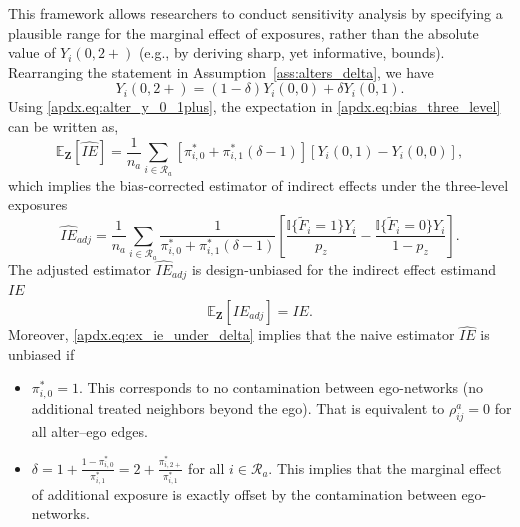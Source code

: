 \documentclass[11pt]{article}
\theoremstyle{definition}
\def \bZ {\boldsymbol{Z}}
\def \cR {\mathcal{R}}
\def \EX {\mathbb{E}}
\begin{document}
This framework allows researchers to conduct sensitivity analysis by 
    specifying a plausible range for the marginal effect of exposures,
     rather than the absolute value of $Y_i(0, 2+)$ (e.g., by deriving sharp, yet informative, bounds).
 Rearranging the statement in Assumption~\ref{ass:alters_delta}, we have
\begin{equation}
    \label{apdx.eq:alter_y_0_1plus}
    Y_i(0, 2+) = (1-\delta) Y_i(0, 0) + \delta Y_i(0, 1).
\end{equation}
Using \eqref{apdx.eq:alter_y_0_1plus}, the expectation in \eqref{apdx.eq:bias_three_level} 
can be written as,
\begin{equation}
    \label{apdx.eq:ex_ie_under_delta}
    \EX_{\bZ}\left[\widehat{IE}\right] =
    \frac{1}{n_a}
    \sum_{i \in \cR_a}
    \left[
        \pi_{i,0}^* + \pi_{i,1}^*(\delta - 1)
    \right]
    \left[
        Y_i(0,1) - Y_i(0,0)
    \right],
\end{equation}
which implies the bias-corrected estimator of indirect effects under 
the three-level exposures
\begin{equation}
    \label{apdx.eq:ie_adjust_three_level}
    \widehat{IE}_{adj} =
    \frac{1}{n_a}
    \sum_{i \in \cR_a}
    \frac{1}{
        \pi_{i,0}^* + \pi_{i,1}^*(\delta - 1)
    }
    \left[
    \frac{\mathbb{I}\{\widetilde{F}_i=1\}Y_i}{p_z} 
    - 
    \frac{\mathbb{I}\{\widetilde{F}_i=0\}Y_i}{1-p_z} 
    \right].
\end{equation}
The adjusted estimator $\widehat{IE}_{adj}$ is design-unbiased for the indirect effect estimand $IE$
\begin{equation*}
    \EX_{\bZ}\left[\widehat{IE}_{adj}\right] = IE.
\end{equation*}
Moreover, \eqref{apdx.eq:ex_ie_under_delta} implies that the naive estimator $\widehat{IE}$ is unbiased 
if 
\begin{itemize}
    \item $\pi_{i,0}^*=1$. This corresponds to no contamination between ego-networks
     (no additional treated neighbors beyond the ego).
     That is equivalent to $\rho^a_{ij} = 0$ for all alter--ego edges.
    \item $\delta = 1  + \frac{1-\pi_{i,0}^*}{\pi_{i,1}^*} = 2 + \frac{\pi_{i,2+}^*}{\pi_{i,1}^*}$ 
    for all $i \in \cR_a$.
         This implies that the marginal effect of additional exposure is exactly offset by the contamination between ego-networks.
\end{itemize}
\end{document}
